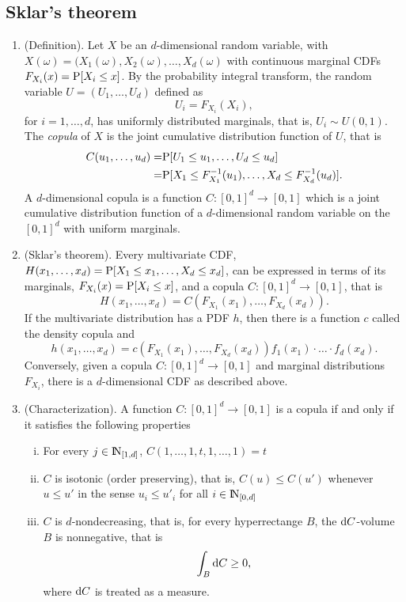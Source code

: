 \documentclass[a4paper,10pt]{scrbook}
\begin{document}
\subsection{Sklar's theorem}
\begin{enumerate}
 \item (Definition). Let \(X\) be an \(d\)-dimensional random variable, with 
       \(X(\omega) = (X_1(\omega), X_2(\omega), \ldots, X_d(\omega)\) with continuous marginal CDFs
       \(F_{X_i}(x) = \mathrm{P}[X_i \leq x]\). By the probability integral transform, the random variable 
       \(U=(U_1,\ldots, U_d)\) defined as 
       \[
        U_i = F_{X_i}(X_i), 
       \]
       for \(i=1,\ldots, d\), has uniformly distributed marginals, that is, 
       \(U_i \sim U(0,1)\). The \textit{copula} of \(X\) is the joint cumulative distribution 
       function of \(U\), that is 
       \begin{align*}
        C(u_1, \ldots, u_d) 
	  =& \mathrm{P}[U_1 \leq u_1, \ldots, U_d \leq u_d]
	  \\
	  =& \mathrm{P}[X_1 \leq F_{X_1}^{-1}(u_1), \ldots, X_d \leq F_{X_d}^{-1}(u_d)].
       \end{align*}
       A \(d\)-dimensional copula is a function \(C:[0,1]^d\to[0,1]\)
       which is a joint cumulative distribution function of a \(d\)-dimensional random variable 
       on the \([0,1]^d\) with uniform marginals.
 \item (Sklar's theorem). Every multivariate CDF, \(H(x_1, \ldots, x_d) = \mathrm{P}[X_1\leq x_1, \ldots, X_d \leq x_d]\),
       can be expressed in terms of its marginals, \(F_{X_i}(x) = \mathrm{P}[X_i \leq x]\), and a copula \(C:[0,1]^d\to[0,1]\), 
       that is 
       \[
        H(x_1, \ldots, x_d) = C(F_{X_1}(x_1), \ldots, F_{X_d}(x_d)).
       \]
       If the multivariate distribution has a PDF \(h\), then there is a function \(c\)
       called the density copula and 
       \[
        h(x_1,\ldots, x_d) = c(F_{X_1}(x_1), \ldots, F_{X_d}(x_d)) f_1(x_1)\cdot \ldots \cdot f_d(x_d).
       \]
       Conversely, given a copula \(C:[0,1]^d\to[0,1]\) and marginal distributions 
       \(F_{X_i}\), there is a \(d\)-dimensional CDF as described above.
 \item (Characterization). A function \(C: [0,1]^d\to[0,1]\) is a copula if and 
       only if it satisfies the following properties
       \begin{enumerate}[i.]
        \item For every \(j\in\N_{[1,d]}\), \(C(1,\ldots, 1, t, 1, \ldots, 1) = t\)
        \item \(C\) is isotonic (order preserving), that is, \(C(u) \leq C(u')\) whenever
        \(u \leq u'\) in the sense \(u_i \leq u'_i\) for all \(i\in\N_{[0,d]}\)
        \item \(C\) is \(d\)-nondecreasing, that is, for every hyperrectange \(B\), 
        the \(\mathrm{d} C\)-volume \(B\) is nonnegative, that is
        \[
         \int_{B}\mathrm{d} C \geq 0,
        \]
        where \(\mathrm{d} C\) is treated as a measure.
       \end{enumerate}
       

\end{enumerate}
\end{document}
